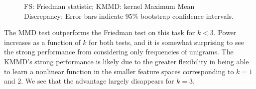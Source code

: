 \begin{figure}
  \begin{center}
    \resizebox{14.0cm}{!}{
      
    }
  \end{center}
  \caption{FS: Friedman statistic; KMMD: kernel Maximum Mean
    Discrepancy; Error bars indicate 95\% bootstrap confidence
    intervals.}
  \label{fig:power_string}
\end{figure}

The MMD test outperforms the Friedman test on this task for $k < 3$.  Power
increases as a function of $k$ for both tests, and it is somewhat
surprising to see the strong performance from considering only
frequencies of unigrams.  The KMMD's strong performance is likely
due to the greater flexibility in being able to learn a nonlinear function
in the smaller feature spaces corresponding to $k = 1$ and $2$.  We see
that the advantage largely disappears for $k = 3$.

